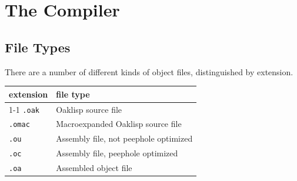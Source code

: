 %
%
%


\chapter{The Compiler}

\section{File Types}

There are a number of different kinds of object files, distinguished
by extension.

\begin{center}
\begin{tabular}{@{\hspace{1.5em}}ll}\toprule
\multicolumn{1}{l}{\textbf{extension}} & \multicolumn{1}{l}{\textbf{file type}} \\\cmidrule(r){1-1}\cmidrule{2-2}
\tt .oak  & Oaklisp source file \\
\tt .omac & Macroexpanded Oaklisp source file \\
\tt .ou   & Assembly file, not peephole optimized \\
\tt .oc   & Assembly file, peephole optimized \\
\tt .oa   & Assembled object file \\\bottomrule
\end{tabular}
\end{center}



